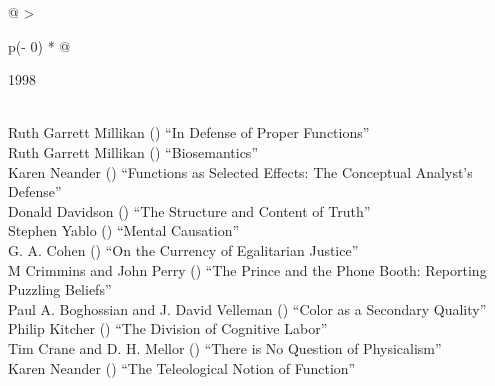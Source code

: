 \documentclass[
  10pt,
  letterpaper,
  DIV=11,
  numbers=noendperiod,
  twoside]{scrartcl}
\begin{document}
\begin{longtable}[]{@{}
  >{\raggedright\arraybackslash}p{(\columnwidth - 0\tabcolsep) * }@{}}

\caption{\label{tbl-top-ten-1989}Most cited articles published less than
ten years ago as of 1998.}

\tabularnewline

\toprule\noalign{}
\begin{minipage}[b]{\linewidth}\raggedright
1998
\end{minipage} \\
\midrule\noalign{}
\endhead
\bottomrule\noalign{}
\endlastfoot
Ruth Garrett Millikan
()
``In Defense of Proper Functions'' \\
Ruth Garrett Millikan
()
``Biosemantics'' \\
Karen Neander
()
``Functions as Selected Effects: The Conceptual Analyst's Defense'' \\
Donald Davidson
()
``The Structure and Content of Truth'' \\
Stephen Yablo
()
``Mental Causation'' \\
G. A. Cohen
()
``On the Currency of Egalitarian Justice'' \\
M Crimmins and John Perry
()
``The Prince and the Phone Booth: Reporting Puzzling Beliefs'' \\
Paul A. Boghossian and J. David Velleman
()
``Color as a Secondary Quality'' \\
Philip Kitcher
()
``The Division of Cognitive Labor'' \\
Tim Crane and D. H. Mellor
()
``There is No Question of Physicalism'' \\
Karen Neander
()
``The Teleological Notion of Function'' \\

\end{longtable}
\end{document}
